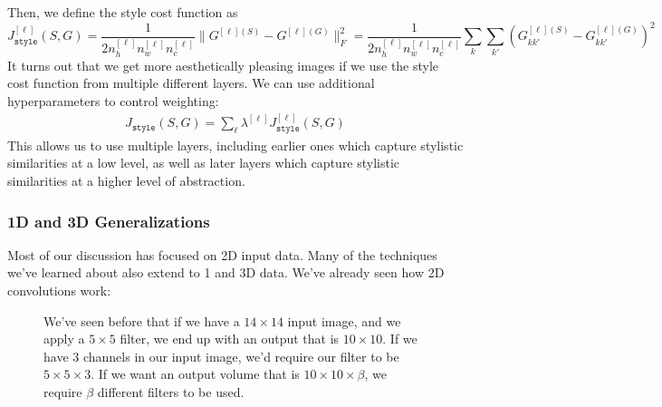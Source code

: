 \documentclass[12pt]{article}
\begin{document}
Then, we define the style cost function as
\[
J_{\texttt{style}}^{[\ell]}(S,G) = \frac{1}{2 n_h^{[\ell]} n_w^{[\ell]} n_c^{[\ell]}}\|G^{[\ell](S)} - G^{[\ell](G)}\|_F^2 = \frac{1}{2 n_h^{[\ell]} n_w^{[\ell]} n_c^{[\ell]}} \sum_k \sum_{k'} \left(G^{[\ell](S)}_{kk'} - G^{[\ell](G)}_{kk'}\right)^2
\]
It turns out that we get more aesthetically pleasing images if we use the style cost function from multiple different layers. We can use additional hyperparameters to control weighting:
\begin{align*}
  J_{\texttt{style}}(S,G) = \sum_{\ell} \lambda^{[\ell]} J_{\texttt{style}}^{[\ell]}(S,G)
\end{align*}
This allows us to use multiple layers, including earlier ones which capture stylistic similarities at a low level, as well as later layers which capture stylistic similarities at a higher level of abstraction.

\subsubsection{1D and 3D Generalizations} Most of our discussion has focused on 2D input data. Many of the techniques we've learned about also extend to 1 and 3D data. We've already seen how 2D convolutions work:
\begin{figure}[h]
  \centering
  \caption{\footnotesize We've seen before that if we have a $14 \times 14$ input image, and     we apply a $5 \times 5$ filter, we end up with an output that is $10 \times 10$.
    If we have $3$ channels in our input image, we'd require our filter to be $5 \times 5 \times 3$. If we want an output volume that is $10 \times 10 \times \beta$, we require $\beta$ different filters to be used.} 
\end{figure}
\end{document}
